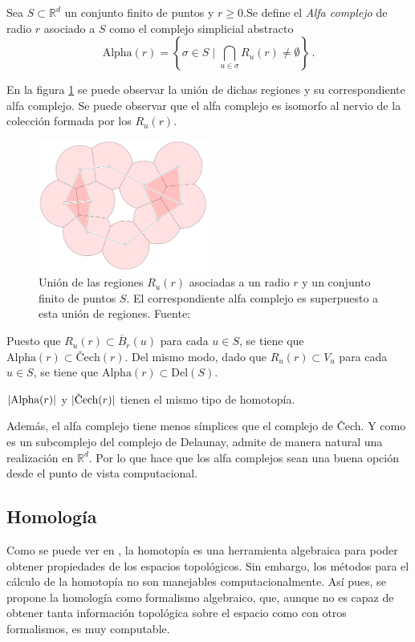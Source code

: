\begin{definition}
Sea $S \subset \mathbb{R}^d$ un conjunto finito de puntos y $r \geq 0$.Se define el \emph{Alfa complejo} de radio $r$ asociado a $S$ como el complejo simplicial abstracto
\[
\text{Alpha}(r)=\left\{\sigma \in S \mid \bigcap_{u \in \sigma}R_u(r) \neq \emptyset \right\}\,.
\]
\end{definition}

En la figura \ref{ref:alpha} se puede observar la unión de dichas regiones y su correspondiente alfa complejo. Se puede observar que el alfa complejo es isomorfo al nervio de la colección formada por los $R_u(r)$.

\begin{figure}[!ht]
\centering
\includegraphics[width=0.5\textwidth]{include/figuras/alpha.png} 
\caption{Unión de las regiones $R_u(r)$ asociadas a un radio $r$ y un conjunto finito de puntos $S$. El correspondiente alfa complejo es superpuesto a esta unión de regiones. Fuente: \cite{libroEH}}
\label{ref:alpha}
\end{figure}

Puesto que $R_u(r) \subset \overline{B}_r(u)$ para cada $u \in S$, se tiene que $\text{Alpha}(r) \subset \text{\v{C}ech}(r)$. Del mismo modo, dado que $R_u(r) \subset V_u$ para cada $u \in S$, se tiene que $\text{Alpha}(r) \subset \text{Del}(S)$.

\begin{property}
$\lvert\text{\rm Alpha}(r)\rvert$ y $\abs{\text{\rm \v{C}ech}(r)}$ tienen el mismo tipo de homotopía.
\end{property}

Además, el alfa complejo tiene menos símplices que el complejo de \v{C}ech. Y como es un subcomplejo del complejo de Delaunay, admite de manera natural una realización en $\mathbb{R}^d$. Por lo que hace que los alfa complejos sean una buena opción desde el punto de vista computacional.

\subsection{Homología}
Como se puede ver en \cite{Hatcher}, la homotopía es una herramienta algebraica para poder obtener propiedades de los espacios topológicos. Sin embargo, los métodos para el cálculo de la homotopía no son manejables computacionalmente. Así pues, se propone la homología como formalismo algebraico, que, aunque no es capaz de obtener tanta información topológica sobre el espacio como con otros formalismos, es muy computable.

